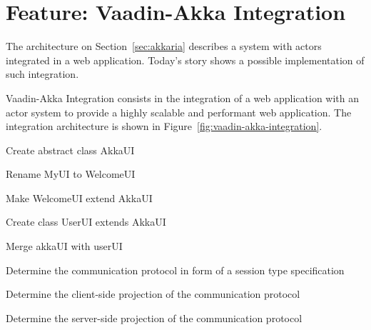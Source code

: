 \section{Feature: Vaadin-Akka Integration}
\label{sec:feature-vaadin-akka}

The architecture on Section~\ref{sec:akkaria} describes a system with
\akka actors integrated in a \vaadin web application.
%
Today's story shows a possible implementation of such integration.  
\begin{feature}
  Vaadin-Akka Integration consists in the integration of a \vaadin web
  application with an \akka actor system to provide a highly scalable
  and performant web application. The integration architecture is
  shown in Figure~\ref{fig:vaadin-akka-integration}.
%

%
  \begin{task}
    Create abstract class AkkaUI\\
  \end{task}
  \begin{task}
    Rename MyUI to WelcomeUI\\
  \end{task}
  \begin{task}
    Make WelcomeUI extend AkkaUI\\
  \end{task}
  \begin{task}
    Create class UserUI extends AkkaUI\\
  \end{task}
  \begin{task}
    Merge akkaUI with userUI\\
  \end{task}
%

  \begin{task}
    Determine the communication protocol in form of a session type
    specification\\
  \end{task}
  \begin{task}
    Determine the client-side projection of the communication
    protocol\\
  \end{task}
  \begin{task}
    Determine the server-side projection of the communication
    protocol\\
  \end{task}
%


\end{feature}
